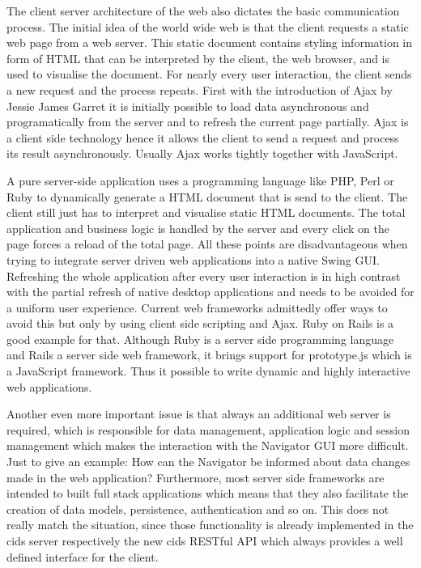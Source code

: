 The client server architecture of the web also dictates the basic communication process.
The initial idea of the world wide web is that the client requests a static web page from a web server.
This static document contains styling information in form of HTML that can be interpreted by the client, the web browser, and is used to visualise the document.
For nearly every user interaction, the client sends a new request and the process repeats.
First with the introduction of Ajax by Jessie James Garret \autocite[]{ajax} it is initially possible to load data asynchronous and programatically from the server and to refresh the current page partially.
Ajax is a client side technology hence it allows the client to send a request and process its result asynchronously.
Usually Ajax works tightly together with JavaScript.

A pure server-side application uses a programming language like PHP, Perl or Ruby to dynamically generate a HTML document that is send to the client.
The client still just has to interpret and visualise static HTML documents.
The total application and business logic is handled by the server and every click on the page forces a reload of the total page.
All these points are disadvantageous when trying to integrate server driven web applications into a native Swing GUI.
Refreshing the whole application after every user interaction is in high contrast with the partial refresh of native desktop applications and needs to be avoided for a uniform user experience.
Current web frameworks admittedly offer ways to avoid this but only by using client side scripting and Ajax.
Ruby on Rails is a good example for that.
Although Ruby is a server side programming language and Rails a server side web framework, it brings support for prototype.js which is a JavaScript framework. Thus it possible to write dynamic and highly interactive web applications.

Another even more important issue is that always an additional web server is required, which is responsible for data management, application logic and session management which makes the interaction with the Navigator GUI more difficult.
Just to give an example: How can the Navigator be informed about data changes made in the web application? Furthermore, most server side frameworks are intended to built full stack applications which means that they also facilitate the creation of data models, persistence, authentication and so on.
This does not really match the situation, since those functionality is already implemented in the cids server respectively the new cids RESTful API which always provides a well defined interface for the client.

